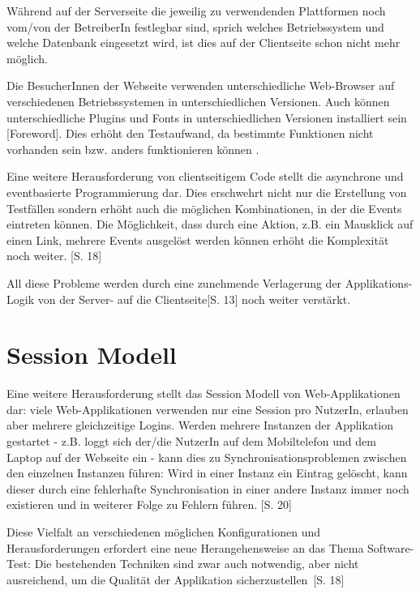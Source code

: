 \documentclass[a4paper,bibtotoc,oneside]{scrbook}
\begin{document}
Während auf der Serverseite die jeweilig zu verwendenden Plattformen noch vom/von der BetreiberIn festlegbar sind, sprich welches Betriebssystem und welche Datenbank eingesetzt wird, ist dies auf der Clientseite schon nicht mehr möglich. 

Die BesucherInnen der Webseite verwenden unterschiedliche Web-Browser auf verschiedenen Betriebssystemen in unterschiedlichen Versionen. Auch können unterschiedliche Plugins und Fonts in unterschiedlichen Versionen installiert sein \cite{testing_apps_on_web}[Foreword]. Dies erhöht den Testaufwand, da bestimmte Funktionen nicht vorhanden sein bzw. anders funktionieren können \cite{caniuse}.

Eine weitere Herausforderung von clientseitigem Code stellt die asynchrone und eventbasierte Programmierung dar. Dies erschwehrt nicht nur die Erstellung von Testfällen sondern erhöht auch die möglichen Kombinationen, in der die Events eintreten können. Die Möglichkeit, dass durch eine Aktion, z.B. ein Mausklick auf einen Link, mehrere Events ausgelöst werden können erhöht die Komplexität noch weiter. \cite{testing_apps_on_web}[S. 18]

All diese Probleme werden durch eine zunehmende Verlagerung der Applikations-Logik von der Server- auf die Clientseite\cite{testing_apps_on_web}[S. 13] noch weiter verstärkt. 

\section{Session Modell}
Eine weitere Herausforderung stellt das Session Modell von Web-Applikationen dar: viele Web-Applikationen verwenden nur eine Session pro NutzerIn, erlauben aber mehrere gleichzeitige Logins. Werden mehrere Instanzen der Applikation gestartet - z.B. loggt sich der/die NutzerIn auf dem Mobiltelefon und dem Laptop auf der Webseite ein - kann dies zu Synchronisationsproblemen zwischen den einzelnen Instanzen führen: Wird in einer Instanz ein Eintrag gelöscht, kann dieser durch eine fehlerhafte Synchronisation in einer andere Instanz immer noch existieren und in weiterer Folge zu Fehlern führen. \cite{testing_apps_on_web}[S. 20]


Diese Vielfalt an verschiedenen möglichen Konfigurationen und Herausforderungen erfordert eine neue Herangehensweise an das Thema Software-Test: Die bestehenden Techniken sind \glqq zwar auch notwendig, aber nicht ausreichend, um die Qualität der Applikation sicherzustellen\grqq\ \cite{eval_automat_webapp_test}[S. 18]
\end{document}
